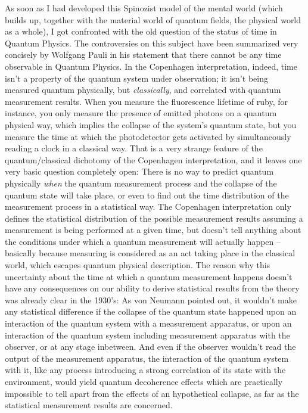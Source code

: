 As soon as I had developed this Spinozist model of the mental world (which builds up, together with the material world of quantum fields, the physical world as a whole), I got confronted with the old question of the status of time in Quantum Physics.
The controversies on this subject have been summarized very concisely by Wolfgang Pauli in his statement that there cannot be any time observable in Quantum Physics.
In the Copenhagen interpretation, indeed, time isn't a property of the quantum system under observation; it isn't being measured quantum physically, but \textit{classically}, and correlated with quantum measurement results.
When you measure the fluorescence lifetime of ruby, for instance, you only measure the presence of emitted photons on a quantum physical way, which implies the collapse of the system's quantum state, but you measure the time at which the photodetector gets activated by simultaneously reading a clock in a classical way.
That is a very strange feature of the quantum/classical dichotomy of the Copenhagen interpretation, and it leaves one very basic question completely open: There is no way to predict quantum physically \textit{when} the quantum measurement process and the collapse of the quantum state will take place, or even to find out the time distribution of the measurement process in a statistical way.
The Copenhagen interpretation only defines the statistical distribution of the possible measurement results assuming a measurement is being performed at a given time, but doesn't tell anything about the conditions under which a quantum measurement will actually happen -- basically because measuring is considered as an act taking place in the classical world, which escapes quantum physical description.
The reason why this uncertainty about the time at which a quantum measurement happens doesn't have any consequences on our ability to derive statistical results from the theory was already clear in the 1930's: As von Neumann pointed out, it wouldn't make any statistical difference if the collapse of the quantum state happened upon an interaction of the quantum system with a measurement apparatus, or upon an interaction of the quantum system including measurement apparatus with the observer, or at any stage inbetween.
And even if the observer wouldn't read the output of the measurement apparatus, the interaction of the quantum system with it, like any process introducing a strong correlation of its state with the environment, would yield quantum decoherence effects which are practically impossible to tell apart from the effects of an hypothetical collapse, as far as the statistical measurement results are concerned.
